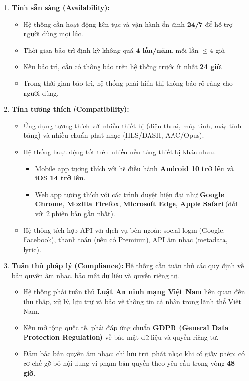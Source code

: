 \begin{enumerate}
    \item \textbf{Tính sẵn sàng (Availability):}
    \begin{itemize}
        \item Hệ thống cần hoạt động liên tục và vận hành ổn định \textbf{24/7} để hỗ trợ người dùng mọi lúc.
        \item Thời gian bảo trì định kỳ không quá \textbf{4 lần/năm}, mỗi lần $\leq 4$ giờ.
        \item Nếu bảo trì, cần có thông báo trên hệ thống trước ít nhất \textbf{24 giờ}.
        \item Trong thời gian bảo trì, hệ thống phải hiển thị thông báo rõ ràng cho người dùng.
    \end{itemize}

    \item \textbf{Tính tương thích (Compatibility):}
    \begin{itemize}
        \item Ứng dụng tương thích với nhiều thiết bị (điện thoại, máy tính, máy tính bảng) và nhiều chuẩn phát nhạc (HLS/DASH, AAC/Opus).
        \item Hệ thống hoạt động tốt trên nhiều nền tảng thiết bị khác nhau:
        \begin{itemize}
            \item Mobile app tương thích với hệ điều hành \textbf{Android 10 trở lên} và \textbf{iOS 14 trở lên}.
            \item Web app tương thích với các trình duyệt hiện đại như \textbf{Google Chrome}, \textbf{Mozilla Firefox}, \textbf{Microsoft Edge}, \textbf{Apple Safari} (đối với 2 phiên bản gần nhất).
        \end{itemize}
        \item Hệ thống tích hợp API với dịch vụ bên ngoài: social login (Google, Facebook), thanh toán (nếu có Premium), API âm nhạc (metadata, lyric).
    \end{itemize}

    \item \textbf{Tuân thủ pháp lý (Compliance):} Hệ thống cần tuân thủ các quy định về bản quyền âm nhạc, bảo mật dữ liệu và quyền riêng tư.
    \begin{itemize}
        \item Hệ thống phải tuân thủ \textbf{Luật An ninh mạng Việt Nam} liên quan đến thu thập, xử lý, lưu trữ và bảo vệ thông tin cá nhân trong lãnh thổ Việt Nam.
        \item Nếu mở rộng quốc tế, phải đáp ứng chuẩn \textbf{GDPR (General Data Protection Regulation)} về bảo mật dữ liệu và quyền riêng tư.
        \item Đảm bảo bản quyền âm nhạc: chỉ lưu trữ, phát nhạc khi có giấy phép; có cơ chế gỡ bỏ nội dung vi phạm bản quyền theo yêu cầu trong vòng \textbf{48 giờ}.
    \end{itemize}


\end{enumerate}
